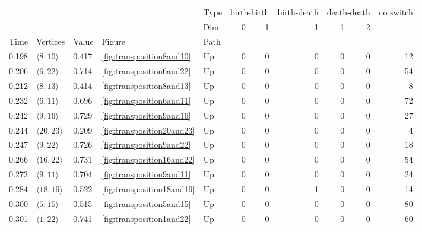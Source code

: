 \documentclass{article}
\begin{document}
\begin{center}
\begin{tabular}{lllllrrrrrr}
\toprule
 &  &  &  & Type & \multicolumn{2}{r}{birth-birth} & birth-death & \multicolumn{2}{r}{death-death} & no switch \\
 &  &  &  & Dim & 0 & 1 & 1 & 1 & 2 &  \\
Time & Vertices & Value & Figure & Path &  &  &  &  &  &  \\
\midrule
0.198 & $\langle8, 10\rangle$ & 0.417 & \ref{fig:transposition8and10} & Up & 0 & 0 & 0 & 0 & 0 & 12 \\
\cline{1-11} \cline{2-11} \cline{3-11} \cline{4-11}
0.206 & $\langle6, 22\rangle$ & 0.714 & \ref{fig:transposition6and22} & Up & 0 & 0 & 0 & 0 & 0 & 54 \\
\cline{1-11} \cline{2-11} \cline{3-11} \cline{4-11}
0.212 & $\langle8, 13\rangle$ & 0.414 & \ref{fig:transposition8and13} & Up & 0 & 0 & 0 & 0 & 0 & 8 \\
\cline{1-11} \cline{2-11} \cline{3-11} \cline{4-11}
0.232 & $\langle6, 11\rangle$ & 0.696 & \ref{fig:transposition6and11} & Up & 0 & 0 & 0 & 0 & 0 & 72 \\
\cline{1-11} \cline{2-11} \cline{3-11} \cline{4-11}
0.242 & $\langle9, 16\rangle$ & 0.729 & \ref{fig:transposition9and16} & Up & 0 & 0 & 0 & 0 & 0 & 27 \\
\cline{1-11} \cline{2-11} \cline{3-11} \cline{4-11}
0.244 & $\langle20, 23\rangle$ & 0.209 & \ref{fig:transposition20and23} & Up & 0 & 0 & 0 & 0 & 0 & 4 \\
\cline{1-11} \cline{2-11} \cline{3-11} \cline{4-11}
0.247 & $\langle9, 22\rangle$ & 0.726 & \ref{fig:transposition9and22} & Up & 0 & 0 & 0 & 0 & 0 & 18 \\
\cline{1-11} \cline{2-11} \cline{3-11} \cline{4-11}
0.266 & $\langle16, 22\rangle$ & 0.731 & \ref{fig:transposition16and22} & Up & 0 & 0 & 0 & 0 & 0 & 54 \\
\cline{1-11} \cline{2-11} \cline{3-11} \cline{4-11}
0.273 & $\langle9, 11\rangle$ & 0.704 & \ref{fig:transposition9and11} & Up & 0 & 0 & 0 & 0 & 0 & 24 \\
\cline{1-11} \cline{2-11} \cline{3-11} \cline{4-11}
0.284 & $\langle18, 19\rangle$ & 0.522 & \ref{fig:transposition18and19} & Up & 0 & 0 & 1 & 0 & 0 & 14 \\
\cline{1-11} \cline{2-11} \cline{3-11} \cline{4-11}
0.300 & $\langle5, 15\rangle$ & 0.515 & \ref{fig:transposition5and15} & Up & 0 & 0 & 0 & 0 & 0 & 80 \\
\cline{1-11} \cline{2-11} \cline{3-11} \cline{4-11}
\multirow[t]{2}{*}{0.301} & $\langle1, 22\rangle$ & 0.741 & \ref{fig:transposition1and22} & Up & 0 & 0 & 0 & 0 & 0 & 60 \\

\end{tabular}
\end{center}
\end{document}
